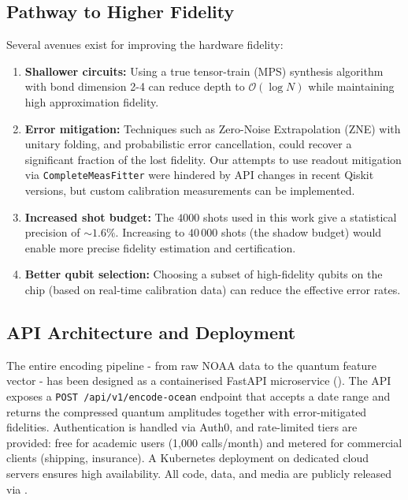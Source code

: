 \documentclass[12pt,a4paper]{article}
\newcommand{\iconlink}[2]{%
  \href{#1}{\raisebox{-0.12ex}{\tikz[baseline=-0.5ex]{\node[draw=gray!60, rounded corners=1pt,
    inner sep=1.5pt, minimum height=0.55cm, minimum width=0.55cm, fill=gray!5] {#2};}}}%
}
\newcommand{\githublink}{\iconlink{https://github.com/BorelSigmaInc/Quantum-Olfacto-Vibration}{GH}}
\begin{document}
\subsection{Pathway to Higher Fidelity}
Several avenues exist for improving the hardware fidelity:
\begin{enumerate}
  \item \textbf{Shallower circuits:} Using a true tensor-train (MPS) synthesis algorithm with bond dimension 2-4 can reduce depth to $\mathcal{O}(\log N)$ while maintaining high approximation fidelity.
  \item \textbf{Error mitigation:} Techniques such as Zero-Noise Extrapolation (ZNE) with unitary folding, and probabilistic error cancellation, could recover a significant fraction of the lost fidelity. Our attempts to use readout mitigation via \texttt{CompleteMeasFitter} were hindered by API changes in recent Qiskit versions, but custom calibration measurements can be implemented.
  \item \textbf{Increased shot budget:} The $4000$ shots used in this work give a statistical precision of $\sim 1.6\%$. Increasing to $40\,000$ shots (the shadow budget) would enable more precise fidelity estimation and certification.
  \item \textbf{Better qubit selection:} Choosing a subset of high-fidelity qubits on the chip (based on real-time calibration data) can reduce the effective error rates.
\end{enumerate}

\subsection{API Architecture and Deployment}
The entire encoding pipeline - from raw NOAA data to the quantum feature vector - has been designed as a containerised FastAPI microservice (). The API exposes a \texttt{POST /api/v1/encode-ocean} endpoint that accepts a date range and returns the compressed quantum amplitudes together with error-mitigated fidelities. Authentication is handled via Auth0, and rate-limited tiers are provided: free for academic users (1,000 calls/month) and metered for commercial clients (shipping, insurance). A Kubernetes deployment on dedicated cloud servers ensures high availability. All code, data, and media are publicly released via \githublink.
\end{document}
